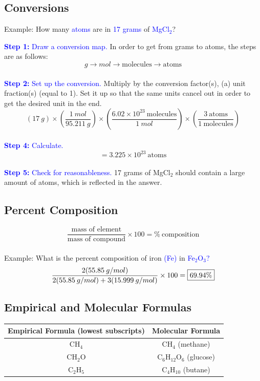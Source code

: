\documentclass[a4paper, 12pt]{article}
\begin{document}
\subsection{Conversions}

Example: How many \textcolor{blue}{atoms} are in \textcolor{blue}{17 grams} of \textcolor{blue}{MgCl$_2$}?

\textcolor{blue}{\textbf{Step 1:} Draw a conversion map.} In order to get from grams to atoms, the steps are as follows: 
\\
$$g \longrightarrow mol \longrightarrow {\text{molecules}} \longrightarrow {\text{atoms}}$$
\\
\textcolor{blue}{\textbf{Step 2:} Set up the conversion.} Multiply by the conversion factor(s), (a) unit fraction(s) (equal to 1). Set it up so that the same units cancel out in order to get the desired unit in the end.
\\
$$(17\: g) \times \left(\frac{1 \: mol}{95.211 \: g}\right) \times \left(\frac{6.02 \times 10^{23} \: {\text{molecules}}}{1 \: mol}\right) \times \left(\frac{3 \: {\text{atoms}}}{1 \: {\text{molecules}}}\right)$$
\\
\textcolor{blue}{\textbf{Step 4:} Calculate.} 
\\
$$ = \boxed{3.225 \times 10^{23} \: \text{atoms}} $$
\\
\textcolor{blue}{\textbf{Step 5:} Check for reasonableness.} 17 grams of MgCl$_2$ should contain a large amount of atoms, which is reflected in the answer.

\subsection{Percent Composition}
$$\frac{\text{mass of element}}{\text{mass of compound}} \times 100 = \% \: \text{composition}$$
\\
Example: What is the percent composition of iron \textcolor{blue}{(Fe)} in \textcolor{blue}{Fe$_2$O$_3$?}
\\
$$\frac{2(55.85 \: g/mol)}{2(55.85 \: g/mol) + 3(15.999 \: g/mol)} \times 100 = \fbox{69.94\%}$$

\subsection{Empirical and Molecular Formulas}

\begin{center}
\begin{tabular}{c|c}

    \textbf{Empirical Formula (lowest subscripts)} & \textbf{Molecular Formula} \\\hline
    CH$_4$ & CH$_4$ (methane) \\
    CH$_2$O & C$_6$H$_{12}$O$_6$ (glucose) \\
    C$_2$H$_5$ & C$_4$H$_{10}$ (butane) \\
\end{tabular}

\end{center}
\end{document}
